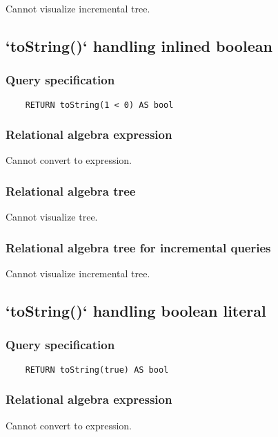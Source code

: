 	Cannot visualize incremental tree.
	\subsection{`toString()` handling inlined boolean}

	\subsubsection*{Query specification}

	\begin{lstlisting}
	RETURN toString(1 < 0) AS bool
	\end{lstlisting}


	\subsubsection*{Relational algebra expression}

	Cannot convert to expression.

	\subsubsection*{Relational algebra tree}

	Cannot visualize tree.

	\subsubsection*{Relational algebra tree for incremental queries}

	Cannot visualize incremental tree.
	\subsection{`toString()` handling boolean literal}

	\subsubsection*{Query specification}

	\begin{lstlisting}
	RETURN toString(true) AS bool
	\end{lstlisting}


	\subsubsection*{Relational algebra expression}

	Cannot convert to expression.

